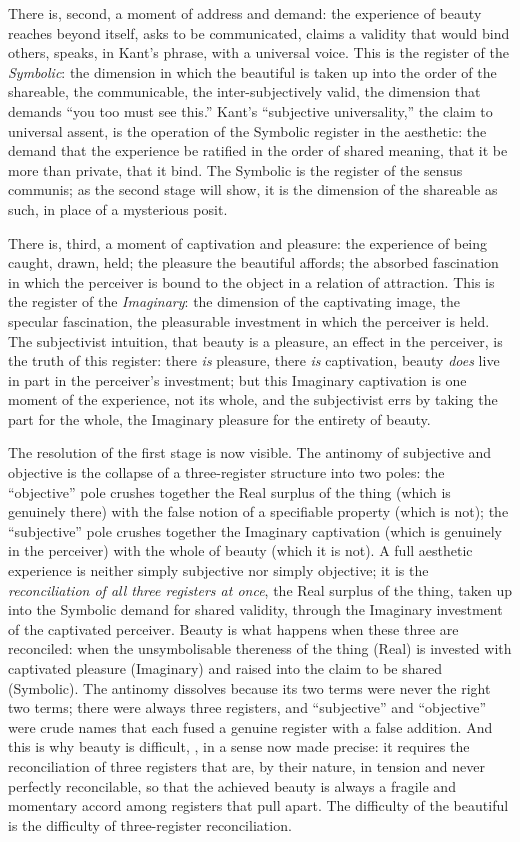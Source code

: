 There is, second, a moment of address and demand: the experience of beauty reaches beyond itself, asks to be communicated, claims a validity that would bind others, speaks, in Kant's phrase, with a universal voice. This is the register of the \emph{Symbolic}: the dimension in which the beautiful is taken up into the order of the shareable, the communicable, the inter-subjectively valid, the dimension that demands ``you too must see this.'' Kant's ``subjective universality,'' the claim to universal assent, is the operation of the Symbolic register in the aesthetic: the demand that the experience be ratified in the order of shared meaning, that it be more than private, that it bind. The Symbolic is the register of the sensus communis; as the second stage will show, it is the dimension of the shareable as such, in place of a mysterious posit.

There is, third, a moment of captivation and pleasure: the experience of being caught, drawn, held; the pleasure the beautiful affords; the absorbed fascination in which the perceiver is bound to the object in a relation of attraction. This is the register of the \emph{Imaginary}: the dimension of the captivating image, the specular fascination, the pleasurable investment in which the perceiver is held. The subjectivist intuition, that beauty is a pleasure, an effect in the perceiver, is the truth of this register: there \emph{is} pleasure, there \emph{is} captivation, beauty \emph{does} live in part in the perceiver's investment; but this Imaginary captivation is one moment of the experience, not its whole, and the subjectivist errs by taking the part for the whole, the Imaginary pleasure for the entirety of beauty.

The resolution of the first stage is now visible. The antinomy of subjective and objective is the collapse of a three-register structure into two poles: the ``objective'' pole crushes together the Real surplus of the thing (which is genuinely there) with the false notion of a specifiable property (which is not); the ``subjective'' pole crushes together the Imaginary captivation (which is genuinely in the perceiver) with the whole of beauty (which it is not). A full aesthetic experience is neither simply subjective nor simply objective; it is the \emph{reconciliation of all three registers at once}, the Real surplus of the thing, taken up into the Symbolic demand for shared validity, through the Imaginary investment of the captivated perceiver. Beauty is what happens when these three are reconciled: when the unsymbolisable thereness of the thing (Real) is invested with captivated pleasure (Imaginary) and raised into the claim to be shared (Symbolic). The antinomy dissolves because its two terms were never the right two terms; there were always three registers, and ``subjective'' and ``objective'' were crude names that each fused a genuine register with a false addition. And this is why beauty is difficult, , in a sense now made precise: it requires the reconciliation of three registers that are, by their nature, in tension and never perfectly reconcilable, so that the achieved beauty is always a fragile and momentary accord among registers that pull apart. The difficulty of the beautiful is the difficulty of three-register reconciliation.

